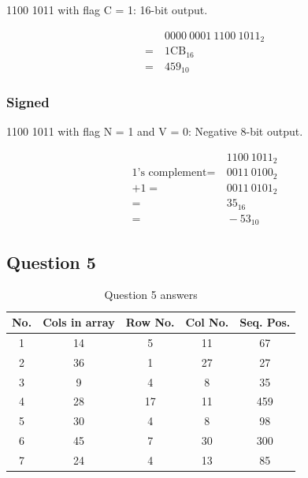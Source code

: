 \documentclass[12pt,a4paper]{article}
\begin{document}
1100 1011 with flag C = 1: 16-bit output.

\begin{align*}
&\ 0000\ 0001\ 1100\ 1011_{2} \\
=&\ 1\text{CB}_{16} \\
=&\ 459_{10}
\end{align*}

\newpage
\subsubsection{Signed}

1100 1011 with flag N = 1 and V = 0: Negative 8-bit output.

\begin{align*}
&\ 1100\ 1011_{2} \\
\text{1's complement} =&\ 0011\ 0100_{2} \\
+ 1 =&\ 0011\ 0101_{2} \\
=&\ 35_{16} \\
=&\ -53_{10}
\end{align*}

\subsection{Question 5}

\begin{table}[!h]
\centering
\caption{Question 5 answers}
\begin{tabular}{c|c|c|c|c}
No. & Cols in array & Row No. & Col No. & Seq. Pos. \\
\hline
1 & 14 &  5 & 11 &  67 \\ \hline
2 & 36 &  1 & 27 &  27 \\ \hline
3 &  9 &  4 &  8 &  35 \\ \hline
4 & 28 & 17 & 11 & 459 \\ \hline
5 & 30 &  4 &  8 &  98 \\ \hline
6 & 45 &  7 & 30 & 300 \\ \hline
7 & 24 &  4 & 13 &  85 \\ \hline
\end{tabular}
\end{table}
\end{document}
